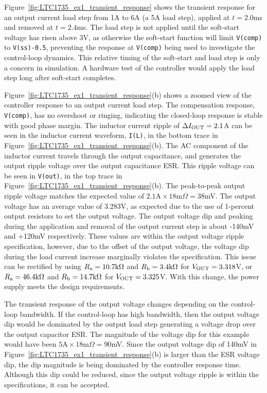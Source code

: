 Figure~\ref{fig:LTC1735_ex1_transient_response} shows the transient
response for an output current load step from 1A to 6A (a 5A load step),
applied at $t = 2.0$ms and removed at $t = 2.4$ms. 
The load step is not applied until the soft-start voltage has 
risen above 3V, as otherwise the soft-start function
will limit \verb+V(comp)+  to \verb+V(ss)-0.5+, preventing the 
response at \verb+V(comp)+ being used to investigate the control-loop
dynamics. This relative timing of the soft-start and load step is only 
a concern in simulation. A hardware test of the controller would
apply the load step long after soft-start completes.

Figure~\ref{fig:LTC1735_ex1_transient_response}(b) shows a zoomed view of
the controller response to an output current load step. The compensation
response, \verb+V(comp)+, has no overshoot or ringing, indicating
the closed-loop response is stable with good phase margin.
The inductor current ripple of $\Delta I_{\rm OUT} = 2.1$A
can be seen in the inductor current waveform, \verb+I(L)+,
in the bottom trace in Figure~\ref{fig:LTC1735_ex1_transient_response}(b).
The AC component of the inductor current travels through the output
capacitance, and generates the output ripple voltage over the output
capacitance ESR.  This ripple voltage can be seen in \verb+V(out)+, in
the top trace in Figure~\ref{fig:LTC1735_ex1_transient_response}(b). 
The peak-to-peak output ripple voltage matches the expected value of 
$2.1\text{A}\times18\text{m}\Omega=38$mV.
The output voltage has an average value of 3.283V, as expected due to 
the use of 1-percent output resistors to set the output voltage. 
The output voltage dip and peaking during the application and removal
of the output current step is about -140mV and +120mV respectively.
These values are within the output voltage ripple specification,
however, due to the offset of the output voltage, the voltage dip
during the load current increase marginally violates the specification.
This issue can be rectified by using $R_{\rm a} = 10.7\text{k}\Omega$
and $R_{\rm b} = 3.4\text{k}\Omega$ for $V_{\rm OUT} = 3.318$V,
or  $R_{\rm a} = 46.4\text{k}\Omega$
and $R_{\rm b} = 14.7\text{k}\Omega$ for $V_{\rm OUT} = 3.325$V.
With this change, the power supply meets the design requirements.

The transient response of the output voltage changes depending on
the control-loop bandwidth. If the control-loop has high bandwidth,
then the output voltage dip would be dominated by the output load
step generating a voltage drop over the output capacitor ESR. 
The magnitude of the voltage dip for this example would have been
$5\text{A}\times18\text{m}\Omega=90$mV.
Since the output voltage dip of 140mV in 
Figure~\ref{fig:LTC1735_ex1_transient_response}(b) is larger than
the ESR voltage dip, the dip magnitude is being dominated by
the controller response time.
Although this dip could be reduced, since the output voltage
ripple is within the specifications, it can be accepted.


